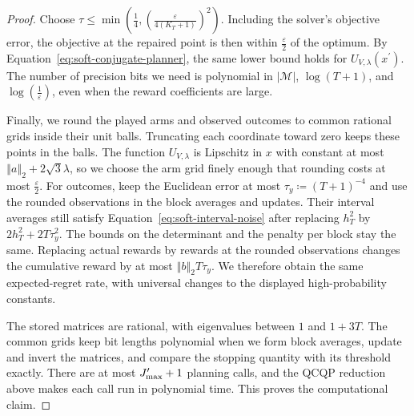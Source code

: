{{\begin{proof}
Choose $\tau \le \operatorname*{min} \left( \frac{1}{4} , {\left( \frac{\varepsilon}{4 \left( K_{T} + 1 \right)} \right)}^{2} \right)$. Including the solver's
objective error, the objective at the repaired point is then within
$\frac{\varepsilon}{2}$ of the optimum. By Equation~\ref{eq:soft-conjugate-planner}, the same lower bound holds for
$U_{V , \lambda} \left( x^{\prime} \right)$. The number of precision bits we need is polynomial in
$\left| \mathcal{M} \right|$, $\operatorname{log} \left( T + 1 \right)$, and $\operatorname{log} \left( \frac{1}{\varepsilon} \right)$, even when the reward
coefficients are large.

Finally, we round the played arms and observed outcomes to common
rational grids inside their unit balls. Truncating each coordinate
toward zero keeps these points in the balls. The function $U_{V , \lambda}$ is
Lipschitz in $x$ with constant at most
${\left\Vert a \right\Vert}_{2} + 2 \sqrt{3} \lambda$, so we choose the arm grid finely enough
that rounding costs at most $\frac{\varepsilon}{2}$. For outcomes, keep the
Euclidean error at most $\tau_{y} \coloneqq {\left( T + 1 \right)}^{- 4}$ and use the rounded
observations in the block averages and updates. Their interval averages
still satisfy Equation~\ref{eq:soft-interval-noise} after replacing $h_{T}^{2}$ by
$2 h_{T}^{2} + 2 T \tau_{y}^{2}$. The bounds on the determinant and the penalty per block stay the
same. Replacing actual rewards by rewards at the rounded observations
changes the cumulative reward by at most ${\left\Vert b \right\Vert}_{2} T \tau_{y}$. We
therefore obtain the same expected-regret rate, with universal changes
to the displayed high-probability constants.

The stored matrices are rational, with eigenvalues between $1$ and
$1 + 3 T$. The common grids keep bit lengths polynomial when we form block
averages, update and invert the matrices, and compare the stopping
quantity with its threshold exactly. There are at most $J_{\text{\normalfont max}}^{\prime} + 1$
planning calls, and the QCQP reduction above makes each call run in
polynomial time. This proves the computational claim.
\end{proof}
}






}
